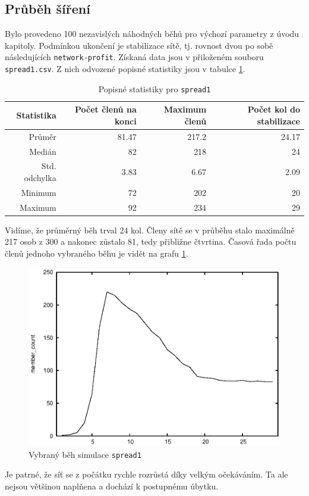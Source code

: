 \documentclass[a4wide,12pt]{report}
\begin{document}
\subsection{Průběh šíření}
Bylo provedeno 100 nezavislých náhodných běhů pro výchozí parametry z úvodu kapitoly. Podmínkou ukončení je stabilizace sítě, tj. rovnost dvou po sobě následujících \texttt{network-profit}. Získaná data jsou v přiloženém souboru \texttt{spread1.csv}. Z nich odvozené popisné statistiky jsou v tabulce \ref{tab:spread1_desc}.
\begin{table}[h]
  \begin{center}
  \begin{tabular}{|r|r|r|r|}
  \hline
  Statistika&Počet členů na konci	&Maximum členů	&Počet kol do stabilizace\\\hline
  Průměr	&81.47	&217.2	&24.17\\
  Medián	&82	&218	&24\\
  Std. odchylka	&3.83	&6.67	&2.09\\
  Minimum	&72	&202	&20\\
  Maximum	&92	&234	&29\\\hline
  \end{tabular}
  \end{center}
  \caption{Popisné statistiky pro \texttt{spread1}}
  \label{tab:spread1_desc}
\end{table}
Vidíme, že průměrný běh trval 24 kol. Členy sítě se v průběhu stalo maximálně 217 osob z 300 a nakonec zůstalo 81, tedy přibližne čtvrtina. Časová řada počtu členů jednoho vybraného běhu je vidět na grafu \ref{fig:spread1_run}.
\begin{figure}[h]
  \centering
  \includegraphics{member_count.eps}
  \caption{Vybraný běh simulace \texttt{spread1}}
  \label{fig:spread1_run}
\end{figure}
Je patrné, že síť se z počátku rychle rozrůstá díky velkým očekáváním. Ta ale nejsou většinou naplňena a dochází k postupnému úbytku.
\end{document}
